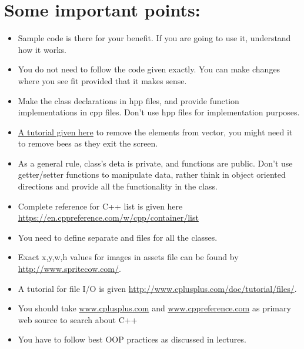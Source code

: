 \documentclass[a4paper,12pt]{article}
\begin{document}
\section{Some important points:} 

\begin{itemize}
	\item Sample code is there for your benefit. If you are going to use it, understand how it works. 
	\item You do not need to follow the code given exactly. You can make changes where you see fit provided that it makes sense.
	\item Make the class declarations in hpp files, and provide function implementations in cpp files. Don't use hpp files for implementation purposes.
	\item \href{https://www.techiedelight.com/remove-elements-vector-inside-loop-cpp/}{A tutorial given here} to remove the elements from vector, you might need it to remove bees as they exit the screen.
	\item As a general rule, class's deta is private, and functions are public. Don't use getter/setter functions to manipulate data, rather think in object oriented directions and provide all the functionality in the class.
	\item Complete reference for C++ list is given here \url{https://en.cppreference.com/w/cpp/container/list}
	\item You need to define separate  and  files for all the classes.
	\item Exact x,y,w,h values for images in assets file can be found by \url{http://www.spritecow.com/}. 
	\item A tutorial for file I/O is given \url{http://www.cplusplus.com/doc/tutorial/files/}. 
	\item You should take \url{www.cplusplus.com} and \url{www.cppreference.com} as primary web source to search about C++
	\item You have to follow best OOP practices as discussed in lectures.
\end{itemize}
\end{document}
